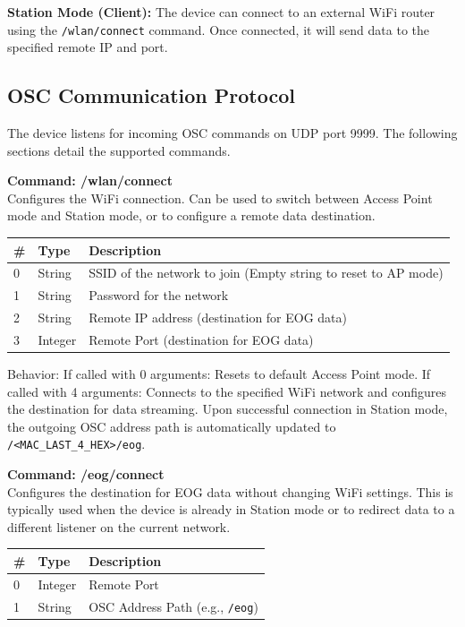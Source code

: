 {\bf Station Mode (Client):}
The device can connect to an external WiFi router using the \texttt{/wlan/connect} command. Once connected, it will send data to the specified remote IP and port.

\subsection*{OSC Communication Protocol}

The device listens for incoming OSC commands on UDP port 9999. The following sections detail the supported commands.



{\bf Command: /wlan/connect}\\
Configures the WiFi connection. Can be used to switch between Access Point mode and Station mode, or to configure a remote data destination.

{\small
\begin{tabular}{|l|l|l|}
\hline
\textbf{\#} & \textbf{Type} & \textbf{Description} \\ \hline
0 & String & SSID of the network to join (Empty string to reset to AP mode) \\ \hline
1 & String & Password for the network \\ \hline
2 & String & Remote IP address (destination for EOG data) \\ \hline
3 & Integer & Remote Port (destination for EOG data) \\ \hline
\end{tabular}
}

Behavior: If called with 0 arguments: Resets to default Access Point mode. If called with 4 arguments: Connects to the specified WiFi network and configures the destination for data streaming. Upon successful connection in Station mode, the outgoing OSC address path is automatically updated to \texttt{/<MAC\_LAST\_4\_HEX>/eog}.


{\bf Command: /eog/connect}\\
Configures the destination for EOG data without changing WiFi settings. This is typically used when the device is already in Station mode or to redirect data to a different listener on the current network.

{\small
\begin{tabular}{|l|l|l|}
\hline
\textbf{\#} & \textbf{Type} & \textbf{Description} \\ \hline
0 & Integer & Remote Port \\ \hline
1 & String & OSC Address Path (e.g., \texttt{/eog}) \\ \hline
\end{tabular}
}


